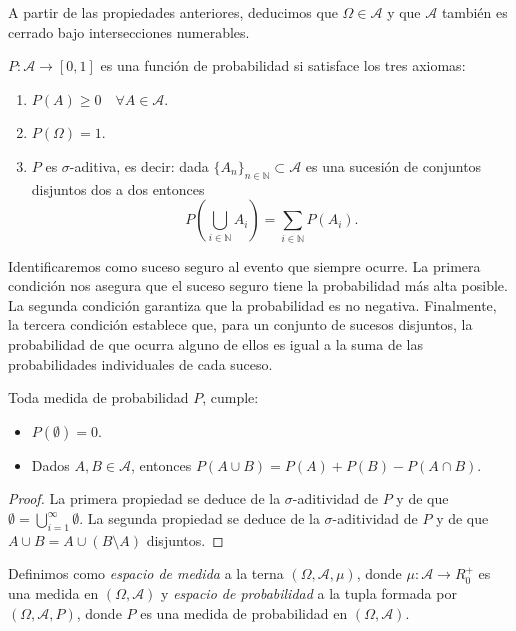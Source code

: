A partir de las propiedades anteriores, deducimos que $\Omega \in \mathcal{A}$ y que $\mathcal{A}$ también es cerrado bajo intersecciones numerables.

\begin{definition}
$P: \mathcal{A} \rightarrow [0,1]$ es una función de probabilidad si satisface los tres axiomas:
\begin{enumerate}
  \item $P(A) \geq 0 \quad \forall A \in \mathcal{A}$.
  \item $P(\Omega) = 1$.
  \item $P$ es $\sigma$-aditiva, es decir: dada $\{A_n \}_{n \in \mathbb{N}} \subset \mathcal{A}$ es una sucesión de conjuntos disjuntos dos a dos entonces
    $$
    P\left( \bigcup_{i\in \mathbb{N}} A_i \right) = \sum_{i \in \mathbb{N}} P(A_i).
    $$
\end{enumerate}
\end{definition}

Identificaremos como suceso seguro al evento que siempre ocurre. La primera condición nos asegura que el suceso seguro tiene la probabilidad más alta posible. La segunda condición garantiza que la probabilidad es no negativa. Finalmente, la tercera condición establece que, para un conjunto de sucesos disjuntos, la probabilidad de que ocurra alguno de ellos es igual a la suma de las probabilidades individuales de cada suceso.

\begin{proposition}
Toda medida de probabilidad $P$, cumple:
\begin{itemize}
\item $P(\emptyset) = 0$.
\item Dados $A, B \in \mathcal{A}$, entonces $P(A \cup B) = P(A) + P(B) - P(A \cap B)$.
\end{itemize}
\end{proposition}

\begin{proof}
  La primera propiedad se deduce de la $\sigma$-aditividad de $P$ y de que $\emptyset = \bigcup_{i=1}^\infty \emptyset$. La segunda propiedad se deduce de la $\sigma$-aditividad de $P$ y de que $A \cup B = A \cup (B \setminus A)$ disjuntos.
\end{proof}

\begin{definition}
Definimos como \textit{espacio de medida} a la terna $(\Omega, \mathcal{A}, \mu)$, donde $\mu: \mathcal{A} \rightarrow R_0^+$ es una medida en $(\Omega, \mathcal{A})$ y \textit{espacio de probabilidad} a la tupla formada por $(\Omega, \mathcal{A}, P)$, donde $P$ es una medida de probabilidad en $(\Omega, \mathcal{A})$.
\end{definition}

